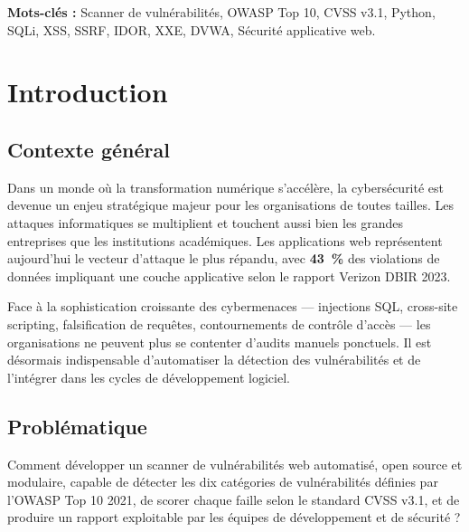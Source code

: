 \documentclass[12pt,a4paper]{report}
\begin{document}
\textbf{Mots-clés :} Scanner de vulnérabilités, OWASP Top 10, CVSS v3.1, Python, SQLi, XSS,
SSRF, IDOR, XXE, DVWA, Sécurité applicative web.

\clearpage

\tableofcontents
\clearpage

\listoftables
{}
\clearpage

\listoffigures
{}
\clearpage

\chapter*{Introduction}

\section*{Contexte général}

Dans un monde où la transformation numérique s'accélère, la cybersécurité est devenue
un enjeu stratégique majeur pour les organisations de toutes tailles. Les attaques
informatiques se multiplient et touchent aussi bien les grandes entreprises que les
institutions académiques. Les applications web représentent aujourd'hui le vecteur
d'attaque le plus répandu, avec \textbf{43~\%} des violations de données impliquant
une couche applicative selon le rapport Verizon DBIR 2023.

Face à la sophistication croissante des cybermenaces — injections SQL, cross-site scripting,
falsification de requêtes, contournements de contrôle d'accès — les organisations ne peuvent
plus se contenter d'audits manuels ponctuels. Il est désormais indispensable d'automatiser
la détection des vulnérabilités et de l'intégrer dans les cycles de développement logiciel.

\section*{Problématique}

Comment développer un scanner de vulnérabilités web automatisé, open source et modulaire,
capable de détecter les dix catégories de vulnérabilités définies par l'OWASP Top 10 2021,
de scorer chaque faille selon le standard CVSS v3.1, et de produire un rapport exploitable
par les équipes de développement et de sécurité ?
\end{document}
